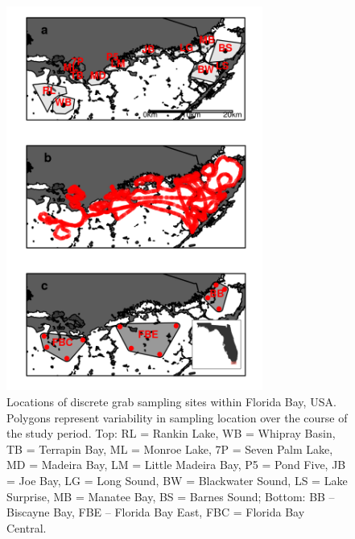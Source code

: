 %
\begin{figure}
  \centering
  \includegraphics[width=0.75\textwidth]{../../figures/fbmap.png}
  \caption{Locations of discrete grab sampling sites within Florida Bay, USA. Polygons represent variability in sampling location over the course of the study period. Top: RL = Rankin Lake, WB = Whipray Basin, TB = Terrapin Bay, ML = Monroe Lake, 7P = Seven Palm Lake, MD = Madeira Bay, LM = Little Madeira Bay, P5 = Pond Five, JB = Joe Bay, LG = Long Sound, BW = Blackwater Sound, LS = Lake Surprise, MB = Manatee Bay, BS = Barnes Sound; Bottom: BB – Biscayne Bay, FBE – Florida Bay East, FBC = Florida Bay Central.}
  \label{fig:1}
\end{figure}

